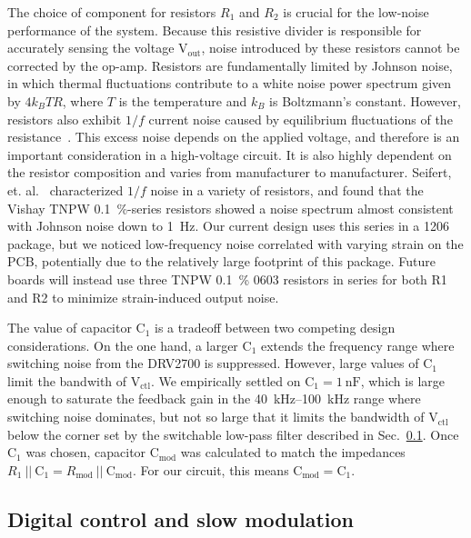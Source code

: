 \documentclass[aip,rsi,reprint]{revtex4-1} %
\begin{document}
The choice of component for resistors $R_1$ and $R_2$ is crucial for the low-noise performance of the system. 
Because this resistive divider is responsible for accurately sensing the voltage $\text{V}_\text{out}$, noise introduced by these resistors cannot be corrected by the op-amp.
Resistors are fundamentally limited by Johnson noise, in which thermal fluctuations contribute to a white noise power spectrum given by $4 k_B T R$, where $T$ is the temperature and $k_B$ is Boltzmann's constant\cite{Horowitz2015a:JN}.
However, resistors also exhibit $1/f$ current noise caused by equilibrium fluctuations of the resistance~\cite{Clarke1974a,Voss1976a}.
This excess noise depends on the applied voltage, and therefore is an important consideration in a high-voltage circuit.
It is also highly dependent on the resistor composition and varies from manufacturer to manufacturer.
Seifert, et. al.~\cite{Seifert2009a} characterized $1/f$ noise in a variety of resistors, and found that the Vishay TNPW \SI{0.1}{\percent}-series resistors showed a noise spectrum almost consistent with Johnson noise down to \SI{1}{\hertz}.
Our current design uses this series in a 1206 package, but we noticed low-frequency noise correlated with varying strain on the PCB, potentially due to the relatively large footprint of this package.
Future boards will instead use three TNPW \SI{0.1}{\percent} 0603 resistors in series for both R1 and R2 to minimize strain-induced output noise.

The value of capacitor $\text{C}_1$ is a tradeoff between two competing design considerations.
On the one hand, a larger $\text{C}_1$ extends the frequency range where switching noise from the DRV2700 is suppressed.
However, large values of $\text{C}_1$ limit the bandwith of $\text{V}_\text{ctl}$.
We empirically settled on $\text{C}_1 = \SI{1}{\nano\farad}$, which is large enough to saturate the feedback gain in the \SI{40}{\kilo\hertz}--\SI{100}{\kilo\hertz} range where switching noise dominates, but not so large that it limits the bandwidth of $\text{V}_\text{ctl}$ below the corner set by the switchable low-pass filter described in Sec.~\ref{Sec:SlowModulationMOS}.
Once $\text{C}_1$ was chosen, capacitor $\text{C}_\text{mod}$ was calculated to match the impedances $R_1~||~\text{C}_1 = R_\text{mod}~||~\text{C}_\text{mod}$.
For our circuit, this means $\text{C}_\text{mod} = \text{C}_1$.


\subsection{Digital control and slow modulation}
\label{Sec:SlowModulationMOS}
\end{document}
